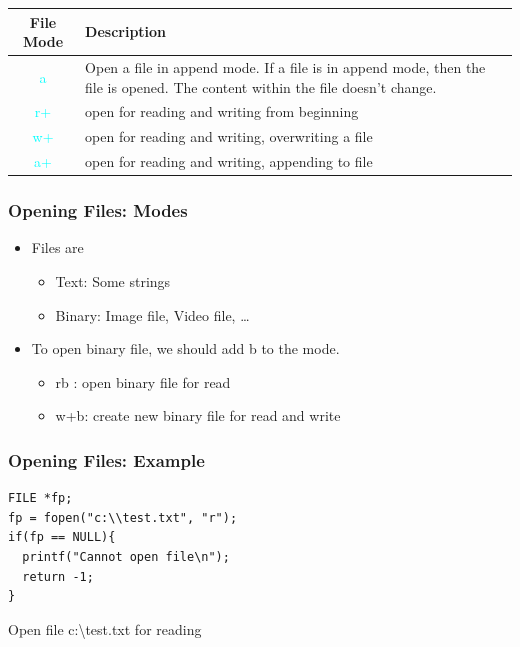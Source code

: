 \documentclass{../c-lecture}
\begin{document}
\begin{frame}
  \begin{table}
  \begin{tabularx}{\textwidth}{cX}
    \toprule
    File Mode &
    Description \\
    \midrule
    \textcolor{Cyan}{a} &
    Open a file in append mode. If a file is in append mode, then the
    file is opened. The content within the file doesn't change. \\
    \midrule
    \textcolor{Cyan}{r+} &
    open for reading and writing from beginning \\
    \midrule
    \textcolor{Cyan}{w+} &
    open for reading and writing, overwriting a file \\
    \midrule
    \textcolor{Cyan}{a+} &
    open for reading and writing, appending to file \\
    \bottomrule
  \end{tabularx}
  \end{table}
\end{frame}

\begin{frame}
  \frametitle{Opening Files: Modes}
  \begin{itemize}
    \item Files are
    \begin{itemize}
      \item Text: Some strings
      \item Binary: Image file, Video file, \ldots
    \end{itemize}
    \item To open binary file, we should add b to the mode.
    \begin{itemize}
      \item rb : open binary file for read
      \item w+b: create new binary file for read and write
    \end{itemize}
  \end{itemize}
\end{frame}

\begin{frame}[fragile]
  \frametitle{Opening Files: Example}
  \begin{verbatim}
FILE *fp;
fp = fopen("c:\\test.txt", "r");
if(fp == NULL){
  printf("Cannot open file\n");
  return -1;
}
  \end{verbatim}
  Open file c:\textbackslash test.txt for reading
\end{frame}
\end{document}
